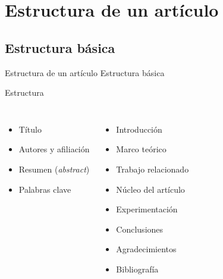 \documentclass{beamer}
\begin{document}
\section{Estructura de un artículo}
\subsection{Estructura básica}

\begin{frame}{Estructura de un artículo} {Estructura básica}
	\begin{block}{Estructura}
	\begin{columns}
			\begin{itemize}
				\item Título
				\item Autores y afiliación
				\item Resumen (\textit{abstract})
				\item Palabras clave
			\end{itemize}

			\begin{itemize}
				\item Introducción
				\item Marco teórico
				\item Trabajo relacionado
				\item Núcleo del artículo
				\item Experimentación
				\item Conclusiones
				\item Agradecimientos
				\item Bibliografía
			\end{itemize}
		\end{columns}
	\end{block}
\end{frame}
\end{document}
